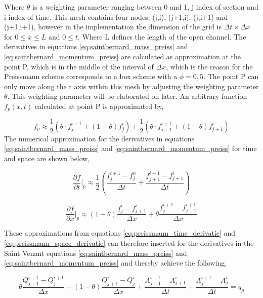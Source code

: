 Where $\theta$ is a weighting parameter ranging between 0 and 1, j index of section and i index of time. This mesh contains four nodes, (j,i), (j+1,i), (j,i+1) and (j+1,i+1), however in the implementation the dimension of the grid is $\Delta t \times \Delta x$ for $0 \leq x \leq L$ and $0\leq t$. Where L defines the length of the open channel. The derivatives in equations \ref{eq:saintbernard_mass_preiss} and \ref{eq:saintbernard_momentum_preiss} are calculated as approximation at the point P, which is in the middle of the interval of $\Delta x$, which is the reason for the Preissmann scheme corresponds to a box scheme with a $\phi =0,5$. The point P can only move along the t axis within this mesh by adjusting the weighting parameter $\theta$. This weighting parameter will be elaborated on later. An arbitrary function $f_p(x,t)$ calculated at point P is approximated by, 

\begin{equation}\label{eq:approximated_function}
	f_p \approx \frac{1}{2} (\theta \cdot f_j^{i+1}+(1-\theta)f_j^i)+\frac{1}{2}(\theta\cdot f_{j+1}^{i+1}+(1-\theta)f_{j+1}^i)
\end{equation}
The numerical approximation for the derivatives in equations \ref{eq:saintbernard_mass_preiss} and \ref{eq:saintbernard_momentum_preiss} for time and space are shown below, 

\begin{equation}\label{eq:preissmann_time_derivatie}
	\frac{\partial f}{\partial t}\bigg \rvert_p \approx \frac{1}{2}\left(\frac{f_j^{i+1}-f_j^n}{\Delta t}+\frac{f_{j+1}^{i+1}-f_{j+1}^i}{\Delta t}\right)
\end{equation}

\begin{equation}\label{eq:preissmann_space_derivatie}
	\frac{\partial f}{\partial x}\bigg \rvert_p \approx (1-\theta)\frac{f_j^i-f_{j+1}^i}{\Delta x}+\theta \frac{f_j^{i+1}-f_{j+1}^{i+1}}{\Delta x}
\end{equation}

These approximations from equations \ref{eq:preissmann_time_derivatie} and \ref{eq:preissmann_space_derivatie} can therefore inserted for the derivatives in the Saint Venant equations \ref{eq:saintbernard_mass_preiss} and \ref{eq:saintbernard_momentum_preiss} and thereby achieve the following, 

\begin{equation}\label{eq:continuity_eq_preissmann}
	\theta \frac{Q_{j+1}^{i+1}-Q_j^{i+1}}{\Delta x}+(1-\theta)\frac{Q_{j+1}^i - Q_j^i}{\Delta x}+
	\frac{A_{j+1}^{i+1}-A_{j+1}^i}{\Delta t}+\frac{A_{j}^{i+1} - A_j^i}{\Delta t} = q_p
\end{equation}

